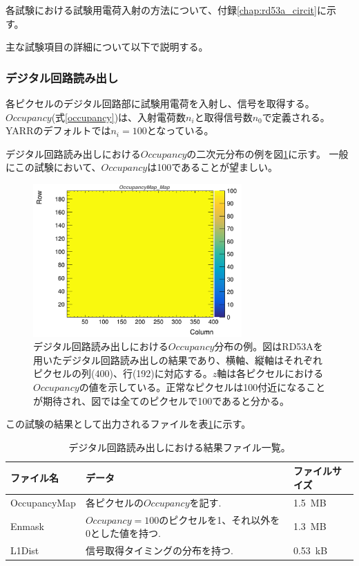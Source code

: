 各試験における試験用電荷入射の方法について、付録\ref{chap:rd53a_circit}に示す。

\clearpage
主な試験項目の詳細について以下で説明する。
\subsubsection{デジタル回路読み出し}
各ピクセルのデジタル回路部に試験用電荷を入射し、信号を取得する。
$Occupancy$(式\ref{occupancy})は、入射電荷数$n_i$と取得信号数$n_0$で定義される。
YARRのデフォルトでは$n_i=100$となっている。

デジタル回路読み出しにおける$Occupancy$の二次元分布の例を図\ref{dig_occ}に示す。
一般にこの試験において、$Occupancy$は100であることが望ましい。

\begin{figure}[bpt]\centering
\includegraphics[width=8cm]{./dig_occ.png}
\caption[デジタル回路読み出しにおける$Occupancy$分布の例。]{デジタル回路読み出しにおける$Occupancy$分布の例。図はRD53Aを用いたデジタル回路読み出しの結果であり、横軸、縦軸はそれぞれピクセルの列(400)、行(192)に対応する。$z$軸は各ピクセルにおける$Occupancy$の値を示している。正常なピクセルは100付近になることが期待され、図では全てのピクセルで100であると分かる。}
\label{dig_occ}
\end{figure}

この試験の結果として出力されるファイルを表\ref{digital_result_files}に示す。

\begin{table}[tbp]
\begin{center}
\caption[デジタル回路読み出しにおける結果ファイル一覧]{デジタル回路読み出しにおける結果ファイル一覧。}
\label{digital_result_files}
  \small
  \begin{tabular}{|lll|} \hline
    ファイル名 & データ & ファイルサイズ \\ \hline
    OccupancyMap & 各ピクセルの$Occupancy$を記す.                           & 1.5~MB \\
    Enmask       & $Occupancy=100$のピクセルを1、それ以外を0とした値を持つ. & 1.3~MB \\ 
    L1Dist       & 信号取得タイミングの分布を持つ. & 0.53~kB \\\hline 
  \end{tabular}
\end{center}
\end{table}

